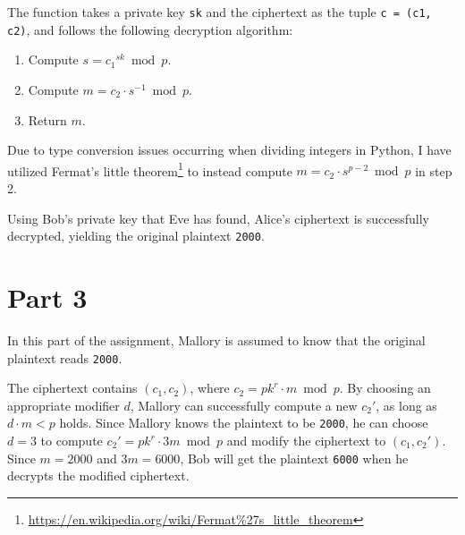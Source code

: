 \documentclass[12pt,a4paper]{article}
\begin{document}
    The function takes a private key \texttt{sk} and the ciphertext as the
    tuple \texttt{c = (c1, c2)}, and follows the following decryption
    algorithm:

    \begin{enumerate}
        \item Compute $s = {c_1}^{sk} \bmod p$.
        \item Compute $m = c_2 \cdot s^{-1} \bmod p$.
        \item Return $m$.
    \end{enumerate}

    Due to type conversion issues occurring when dividing integers in Python,
    I have utilized Fermat's little
    theorem\footnote{\url{https://en.wikipedia.org/wiki/Fermat\%27s\_little\_theorem}}
    to instead compute $m = c_2 \cdot s^{p - 2} \bmod p$ in step 2.

    Using Bob's private key that Eve has found, Alice's ciphertext is
    successfully decrypted, yielding the original plaintext \texttt{2000}.

    \section*{Part 3}

    In this part of the assignment, Mallory is assumed to know that the
    original plaintext reads \texttt{2000}.

    The ciphertext contains $(c_1, c_2)$, where $c_2 = {pk}^r \cdot m \bmod
    p$. By choosing an appropriate modifier $d$, Mallory can successfully
    compute a new $c_2'$, as long as $d \cdot m < p$ holds. Since Mallory
    knows the plaintext to be \texttt{2000}, he can choose $d = 3$ to compute
    $c_2' = {pk}^r \cdot 3m \bmod p$ and modify the ciphertext to $(c_1,
    c_2')$. Since $m = 2000$ and $3m = 6000$, Bob will get the plaintext
    \texttt{6000} when he decrypts the modified ciphertext.
\end{document}
